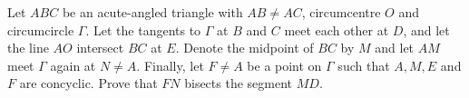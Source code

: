 Let $ABC$ be an acute-angled triangle with $AB \neq AC$,  circumcentre $O$ and circumcircle $\Gamma$. Let the tangents to $\Gamma$ at $B$ and $C$ meet each other at $D$,  and let the line $AO$ intersect $BC$ at $E$. Denote the midpoint of $BC$ by $M$ and let $AM$ meet $\Gamma$ again at $N \neq A$. Finally, let $F \neq A$ be a point on $\Gamma$ such that $A, M, E$ and $F$ are concyclic. Prove that $FN$ bisects the segment $MD$.